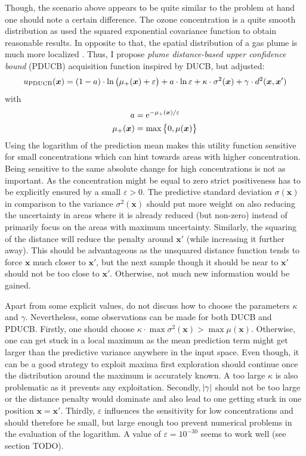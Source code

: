 \documentclass[11pt,a4paper]{scrreprt}
\newcommand{\vc}[1]{\bm{#1}}
\newcommand{\e}{\mathrm e}
\newcommand{\newterm}[1]{\emph{#1}}
\begin{document}
Though, the scenario above appears to be quite similar to the problem at hand 
one should note a certain difference. The ozone concentration is a quite smooth 
distribution as \textcite{Marchant:2012wb} used the squared exponential 
covariance function to obtain reasonable results. In opposite to that, the 
spatial distribution of a gas plume is much more localized \parencite[][this was 
also noted by]{Stachniss:2008vz}. Thus, I propose \newterm{plume distance-based 
    upper confidence bound} (PDUCB) acquisition function inspired by DUCB, but 
adjusted:
\begin{equation}
    u_{\text{PDUCB}}(\vc x) = \del{1 - a} \cdot \ln\del{\mu_+(\vc x) 
        + \varepsilon} + a \cdot \ln \varepsilon + \kappa \cdot \sigma^2(\vc x) 
    + \gamma \cdot d^2(\vc x, \vc x')
\end{equation}
with
\begin{align}
    a &= \e^{-\mu_+(\vc x) / \varepsilon} \\
    \mu_+(\vc x) &= \max\cbr{0, \mu(\vc x)}
\end{align}
Using the logarithm of the prediction mean makes this utility function sensitive 
for small concentrations which can hint towards areas with higher concentration.  
Being sensitive to the same absolute change for high concentrations is not as 
important. As the concentration might be equal to zero strict positiveness has 
to be explicitly ensured by a small $\varepsilon > 0$. The predictive standard 
deviation $\sigma(\vc x)$ in comparison to the variance $\sigma^2(\vc x)$ should 
put more weight on also reducing the uncertainty in areas where it is already 
reduced (but non-zero) instead of primarily focus on the areas with maximum 
uncertainty. Similarly, the squaring of the distance will reduce the penalty 
around $\vc x'$ (while increasing it further away). This should be advantageous 
as the unsquared distance function tends to force $\vc x$ much closer to $\vc 
x'$, but the next sample though it should be near to $\vc x'$ should not be too 
close to $\vc x'$. Otherwise, not much new information would be gained.

Apart from some explicit values, \textcite{Marchant:2012wb} do not discuss how 
to choose the parameters $\kappa$ and $\gamma$. Nevertheless, some observations 
can be made for both DUCB and PDUCB. Firstly, one should choose $\kappa \cdot 
\max \sigma^2(\vc x) > \max \mu(\vc x)$. Otherwise, one can get stuck in a local 
maximum as the mean prediction term might get larger than the predictive 
variance anywhere in the input space. Even though, it can be a good strategy to 
exploit maxima first exploration should continue once the distribution around 
the maximum is accurately known. A too large $\kappa$ is also problematic as it 
prevents any exploitation. Secondly, $\abs{\gamma}$ should not be too large or 
the distance penalty would dominate and also lead to one getting stuck in one 
position $\vc x = \vc x'$. Thirdly, $\varepsilon$ influences the sensitivity for 
low concentrations and should therefore be small, but large enough too prevent 
numerical problems in the evaluation of the logarithm. A value of $\varepsilon 
= 10^{-30}$ seems to work well (see section TODO).
\end{document}
